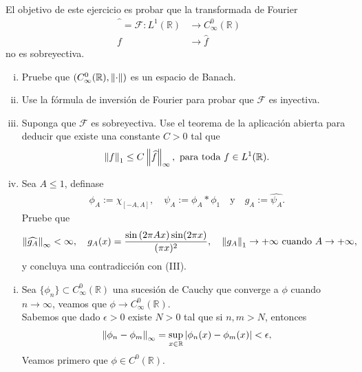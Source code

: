 \begin{homeworkProblem}
  El objetivo de este ejercicio es probar que la transformada de Fourier
  \begin{align*}
    \hat{\phantom{f}}=\mathcal{F}:L^{1}(\mathbb{R})&\to C^{0}_{\infty}(\mathbb{R})\\
    f&\to\hat{f}
  \end{align*}
  no es sobreyectiva.
  \begin{enumerate}[(i)]
    \item Pruebe que $(C^{0}_{\infty}(\mathbb{R}),\left\|\cdot\right\|)$ es un espacio de Banach.
    \item Use la fórmula de inversión de Fourier para probar que $\mathcal{F}$ es inyectiva.
    \item Suponga que $\mathcal{F}$ es sobreyectiva. Use el teorema de la aplicación abierta para deducir que existe una constante $C>0$ tal que
      \begin{align*}
        \left\|f\right\|_{1}\leq C\left\|\widehat{f}\right\|_{\infty},\text{ para toda $f\in L^1(\mathbb{R})$.}
      \end{align*}
    \item Sea $A\leq 1$, definase
      \begin{align*}
        \phi_{A}:=\chi_{[-A,A]},\quad\psi_{A}:=\phi_{A}*\phi_{1}\quad\text{y}\quad g_{A}:=\hat{\psi_{A}}.
      \end{align*}
      Pruebe que
      \begin{align*}
        \left\|\widehat{g_A}\right\|_{\infty}<\infty,\quad g_{A}(x)=\frac{\sin\left( 2\pi Ax \right)\sin(2\pi x)}{(\pi x)^2},\quad\left\|g_{A}\right\|_{1}\to +\infty\text{ cuando }A\to +\infty,
      \end{align*}
      y concluya una contradicción con (III).
  \end{enumerate}
  \begin{solution}
    \begin{enumerate}[(i)]
      \item Sea $\{\phi_{n}\}\subset C^{0}_{\infty}(\mathbb{R})$ una sucesión de Cauchy que converge a $\phi$ cuando $n\to \infty$, veamos que $\phi\to C^{0}_{\infty}(\mathbb{R})$.\\
        Sabemos que dado $\epsilon>0$ existe $N>0$ tal que si $n,m>N$, entonces
        \begin{align*}
          \left\|\phi_{n}-\phi_{m}\right\|_{\infty}=\sup_{x\in\mathbb{R}}|\phi_{n}(x)-\phi_{m}(x)|<\epsilon,
        \end{align*}
        Veamos primero que $\phi\in C^{0}(\mathbb{R})$.\\

\end{enumerate}
\end{solution}
\end{homeworkProblem}
